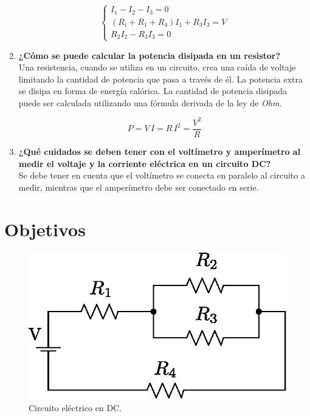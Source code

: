 \documentclass[letter,11pt]{article}
\begin{document}
\begin{enumerate}
\begin{equation*}
    \begin{cases}
        I_1 - I_2 - I_3 = 0 \\
        (R_i + R_1 + R_4) I_1 + R_3 I_3 = V \\
        R_2 I_2 - R_3 I_3 = 0
    \end{cases}
\end{equation*}

\item \textbf{¿Cómo se puede calcular la potencia disipada en un resistor?} \\
Una resistencia, cuando se utiliza en un circuito, crea una caída de voltaje
limitando la cantidad de potencia que pasa a través de él. La potencia extra se
disipa en forma de energía calórica. La cantidad de potencia disipada puede ser
calculada utilizando una fórmula derivada de la ley de \emph{Ohm}.

\begin{equation*}
    P = V\,I = R\,I^2 = \frac{V^2}{R}
\end{equation*}

\item \textbf{¿Qué cuidados se deben tener con el voltímetro y amperímetro al
medir el voltaje y la corriente eléctrica en un circuito DC?} \\
Se debe tener en cuenta que el voltímetro se conecta en paralelo al circuito a
medir, mientras que el amperímetro debe ser conectado en serie.

\end{enumerate}

\section{Objetivos}

\begin{figure}[!h]
\centering
\includegraphics[scale=0.85]{resources/figura1.eps}
\caption{Circuito eléctrico en DC.}
\label{figura1}
\end{figure}
\end{document}
